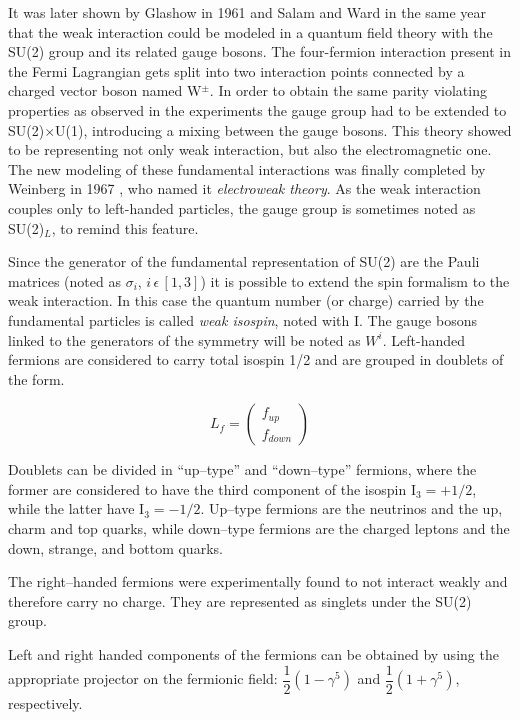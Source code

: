 It was later shown by Glashow in 1961 \cite{Glashow:1961tr} and Salam and Ward \cite{Salam:1961en} in the same year that the weak interaction could be modeled in a quantum field theory with the SU(2) group and its related gauge bosons. 
The four-fermion interaction present in the Fermi Lagrangian gets split into two interaction points connected by a charged vector boson named W$^\pm$. In order to obtain the same parity violating properties as observed in the experiments the gauge group had to be extended to SU(2)$\times$U(1), introducing a mixing between the gauge bosons. This theory showed to be representing not only weak interaction, but also the electromagnetic one. 
The new modeling of these fundamental interactions was finally completed by Weinberg in 1967 \cite{Weinberg:1967tq}, who named it \emph{electroweak theory}. 
As the weak interaction couples only to left-handed particles, the gauge group is sometimes noted as SU(2)$_L$, to remind this feature.

Since the generator of the fundamental representation of SU(2) are the Pauli matrices (noted as $\sigma_i$, $i \, \epsilon \, [1,3]$) it is possible to extend the spin formalism to the weak interaction. In this case the quantum number (or charge) carried by the fundamental particles is called \emph{weak isospin}, noted with I. The gauge bosons linked to the generators of the symmetry will be noted as $W^i$. Left-handed fermions are considered to carry total isospin 1/2 and are grouped in doublets of the form.

\begin{equation}
L_f = \left(\begin{array}{c}f_{up} \\f_{down}\end{array}\right)
\end{equation}

Doublets can be divided in ``up--type'' and ``down--type'' fermions, where the former are considered to have the third component of the isospin I$_3 = +1/2$, while the latter have I$_3 = -1/2$. Up--type fermions are the neutrinos and the up, charm and top quarks, while down--type fermions are the charged leptons and the down, strange, and bottom quarks.

The right--handed fermions were experimentally found to not interact weakly and therefore carry no charge. They are represented as singlets under the SU(2) group.

Left and right handed components of the fermions can be obtained by using the appropriate projector on the fermionic field: $\dfrac{1}{2}(1-\gamma^5)$ and $\dfrac{1}{2}(1+\gamma^5)$, respectively.

